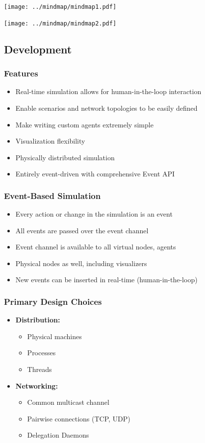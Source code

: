 \documentclass[mathserif,usenames,dvipsnames]{beamer}
\begin{document}
\frame
{
    \begin{center}
        \texttt{[image: ../mindmap/mindmap1.pdf]}
    \end{center}
}

\frame
{
    \begin{center}
        \texttt{[image: ../mindmap/mindmap2.pdf]}
    \end{center}
}
\subsection{Development}

\frame
{
    \frametitle{Features}
    \begin{itemize}
        \item Real-time simulation allows for human-in-the-loop interaction
        \item Enable scenarios and network topologies to be easily defined
        \item Make writing custom agents extremely simple
        \item Visualization flexibility
        \item Physically distributed simulation
        \item Entirely event-driven with comprehensive Event API
    \end{itemize}
}

\frame
{
    \frametitle{Event-Based Simulation}
    \begin{itemize}
        \item Every action or change in the simulation is an event
        \item All events are passed over the event channel
        \item Event channel is available to all virtual nodes, agents
        \item Physical nodes as well, including visualizers
        \item New events can be inserted in real-time (human-in-the-loop)
    \end{itemize}
}

\frame
{
    \frametitle{Primary Design Choices}
    \begin{itemize}
        \item \textbf{Distribution:}
        \begin{itemize}
            \item Physical machines
            \item Processes
            \item Threads
        \end{itemize}
        \item \textbf{Networking:} 
        \begin{itemize}
            \item Common multicast channel
            \item Pairwise connections (TCP, UDP)
            \item Delegation Daemons
        \end{itemize}
    \end{itemize}
}
\end{document}
